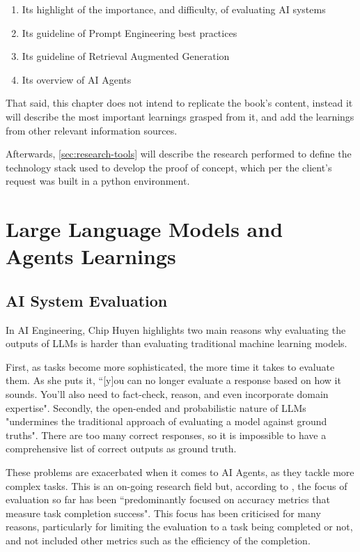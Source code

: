 \documentclass[a4paper]{report}
\begin{document}
\begin{enumerate}
    \item Its highlight of the importance, and difficulty, of evaluating AI systems
    \item Its guideline of Prompt Engineering best practices
    \item Its guideline of Retrieval Augmented Generation
    \item Its overview of AI Agents
\end{enumerate}

That said, this chapter does not intend to replicate the book's content, instead it will describe the most important learnings grasped from it, and add the learnings from other relevant information sources.

Afterwards, \autoref{sec:research-tools} will describe the research performed to define the technology stack used to develop the proof of concept, which per the client's request was built in a python environment.

\section{Large Language Models and Agents Learnings}
\label{sec:research-llms}

\subsection{AI System Evaluation}

In AI Engineering, Chip Huyen highlights two main reasons why evaluating the outputs of LLMs is harder than evaluating traditional machine learning models.

First, as tasks become more sophisticated, the more time it takes to evaluate them. As she puts it, ``[y]ou can  no longer evaluate a response based on how it sounds. You'll also need to fact-check, reason, and even incorporate domain expertise".  Secondly, the open-ended and probabilistic nature of LLMs "undermines the traditional approach of evaluating a model against ground truths". There are too many correct responses, so it is impossible to have a comprehensive list of correct outputs as ground truth.

These problems are exacerbated when it comes to AI Agents, as they tackle more complex tasks. This is an on-going research field but, according to \cite{krishnan2025aiagentsevolutionarchitecture}, the focus of evaluation so far has been ``predominantly focused on accuracy metrics that measure task completion success". This focus has been criticised for many reasons, particularly for limiting the evaluation to a task being completed or not, and not included other metrics such as the efficiency of the completion.
\end{document}
